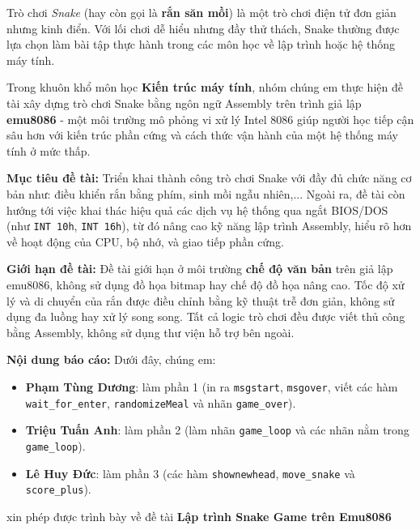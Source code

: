 Trò chơi \textit{Snake} (hay còn gọi là \textbf{rắn săn mồi}) là một trò chơi điện tử đơn giản nhưng kinh điển. Với lối chơi dễ hiểu nhưng đầy thử thách, Snake thường được lựa chọn làm bài tập thực hành trong các môn học về lập trình hoặc hệ thống máy tính. 

\vspace{0.5em}

Trong khuôn khổ môn học \textbf{Kiến trúc máy tính}, nhóm chúng em thực hiện đề tài xây dựng trò chơi Snake bằng ngôn ngữ Assembly trên trình giả lập \textbf{emu8086} - một môi trường mô phỏng vi xử lý Intel 8086 giúp người học tiếp cận sâu hơn với kiến trúc phần cứng và cách thức vận hành của một hệ thống máy tính ở mức thấp.

\vspace{0.5em}

\textbf{Mục tiêu đề tài:} Triển khai thành công trò chơi Snake với đầy đủ chức năng cơ bản như: điều khiển rắn bằng phím, sinh mồi ngẫu nhiên,... Ngoài ra, đề tài còn hướng tới việc khai thác hiệu quả các dịch vụ hệ thống qua ngắt BIOS/DOS (như \texttt{INT 10h}, \texttt{INT 16h}), từ đó nâng cao kỹ năng lập trình Assembly, hiểu rõ hơn về hoạt động của CPU, bộ nhớ, và giao tiếp phần cứng.

\vspace{0.5em}

\textbf{Giới hạn đề tài:} Đề tài giới hạn ở môi trường \textbf{chế độ văn bản} trên giả lập emu8086, không sử dụng đồ họa bitmap hay chế độ đồ họa nâng cao. Tốc độ xử lý và di chuyển của rắn được điều chỉnh bằng kỹ thuật trễ đơn giản, không sử dụng đa luồng hay xử lý song song. Tất cả logic trò chơi đều được viết thủ công bằng Assembly, không sử dụng thư viện hỗ trợ bên ngoài.

\vspace{0.5em}

\textbf{Nội dung báo cáo:} Dưới đây, chúng em:
\begin{itemize}
    \item \textbf{Phạm Tùng Dương}: làm phần 1 (in ra \texttt{msgstart}, \texttt{msgover}, viết các hàm \texttt{wait\_for\_enter}, \texttt{randomizeMeal} và nhãn \texttt{game\_over}).
    \item \textbf{Triệu Tuấn Anh}: làm phần 2 (làm nhãn \texttt{game\_loop} và các nhãn nằm trong \texttt{game\_loop}).
    \item \textbf{Lê Huy Đức}: làm phần 3 (các hàm \texttt{shownewhead}, \texttt{move\_snake} và \texttt{score\_plus}).
\end{itemize}
xin phép được trình bày về đề tài \textbf{Lập trình Snake Game trên Emu8086}